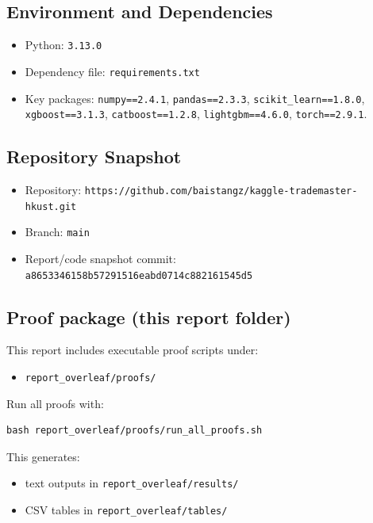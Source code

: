 \subsection{Environment and Dependencies}
\begin{itemize}[leftmargin=1.5em]
  \item Python: \texttt{3.13.0}
  \item Dependency file: \texttt{requirements.txt}
  \item Key packages: \texttt{numpy==2.4.1}, \texttt{pandas==2.3.3}, \texttt{scikit\_learn==1.8.0}, \texttt{xgboost==3.1.3}, \texttt{catboost==1.2.8}, \texttt{lightgbm==4.6.0}, \texttt{torch==2.9.1}.
\end{itemize}

\subsection{Repository Snapshot}
\begin{itemize}[leftmargin=1.5em]
  \item Repository: \texttt{https://github.com/baistangz/kaggle-trademaster-hkust.git}
  \item Branch: \texttt{main}
  \item Report/code snapshot commit: \texttt{a8653346158b57291516eabd0714c882161545d5}
\end{itemize}

\subsection{Proof package (this report folder)}
This report includes executable proof scripts under:
\begin{itemize}[leftmargin=1.5em]
  \item \texttt{report\_overleaf/proofs/}
\end{itemize}

Run all proofs with:
\begin{Verbatim}[fontsize=\small]
bash report_overleaf/proofs/run_all_proofs.sh
\end{Verbatim}

This generates:
\begin{itemize}[leftmargin=1.5em]
  \item text outputs in \texttt{report\_overleaf/results/}
  \item CSV tables in \texttt{report\_overleaf/tables/}
\end{itemize}

